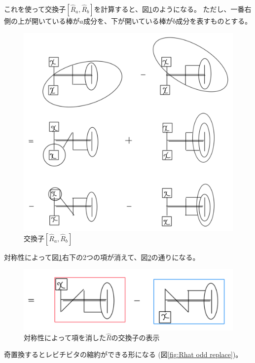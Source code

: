 \documentclass{jsarticle}
\begin{document}
これを使って交換子$[\hat{R}_a,\hat{R}_b]$を計算すると、図\ref*{fig:Rhat commutator}のようになる。
ただし、一番右側の上が開いている棒が$a$成分を、下が開いている棒が$b$成分を表すものとする。

\begin{figure}
    \centering
    \includegraphics{Rhat-commutator.png}
    \caption{交換子$[\hat{R}_a,\hat{R}_b]$}
    \label{fig:Rhat commutator}
\end{figure}

対称性によって図\ref{fig:Rhat commutator}右下の2つの項が消えて、図\ref*{fig:Rhat symmmetry}の通りになる。

\begin{figure}
    \centering
    \includegraphics{Rhat-symmmetry.png}
    \caption[]{対称性によって項を消した$\hat{R}$の交換子の表示}
    \label{fig:Rhat symmmetry}
\end{figure}

奇置換するとレビチビタの縮約ができる形になる (図\ref*{fig:Rhat odd replace})。
\end{document}
